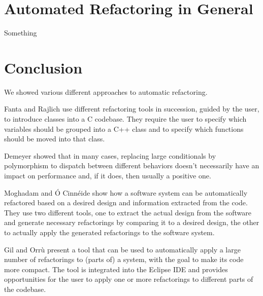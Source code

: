 \documentclass[conference,compsoc,a4paper]{IEEEtran}
\begin{document}
\section{Automated Refactoring in General}

Something


\section{Conclusion}

We showed various different approaches to automatic refactoring.

Fanta and Rajlich \cite{cpp} use different refactoring tools in succession, guided by the user, to introduce classes 
into a C codebase. They require the user to specify which variables should be grouped into a C++ class and to specify 
which functions should be moved into that class.

Demeyer \cite{polymorphism} showed that in many cases, replacing large conditionals by polymorphism to dispatch between 
different behaviors doesn't necessarily have an impact on performance and, if it does, then usually a positive one.

Moghadam and Ó Cinnéide \cite{design-diff} show how a software system can be automatically refactored based on a 
desired design and information extracted from the code. They use two different tools, one to extract the actual design 
from the software and generate necessary refactorings by comparing it to a desired design, the other to actually apply 
the generated refactorings to the software system.

Gil and Orrù \cite{sparta} present a tool that can be used to automatically apply a large number of refactorings to 
(parts of) a system, with the goal to make its code more compact. The tool is integrated into the Eclipse IDE and 
provides opportunities for the user to apply one  or more refactorings to different parts of the codebase.







\end{document}
